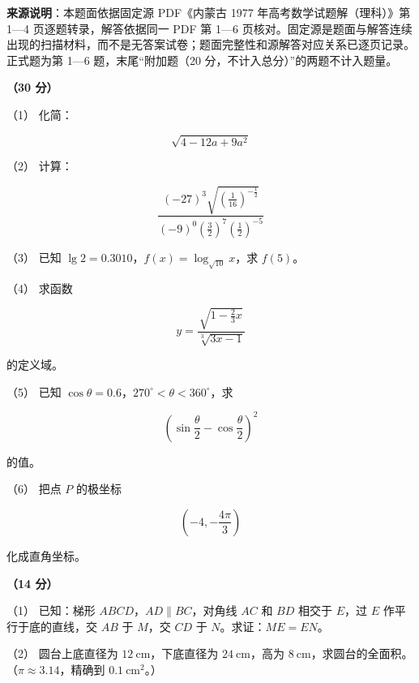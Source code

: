 


\begin{gktip}
\textbf{来源说明}：本题面依据固定源 PDF《内蒙古 1977 年高考数学试题解（理科）》第 1—4 页逐题转录，解答依据同一 PDF 第 1—6 页核对。固定源是题面与解答连续出现的扫描材料，而不是无答案试卷；题面完整性和源解答对应关系已逐页记录。正式题为第 1—6 题，末尾“附加题（20 分，不计入总分）”的两题不计入题量。
\end{gktip}

\begin{question}
\textbf{（30 分）} 

（1） 化简：

\nopagebreak[4]
\[
\sqrt{4-12a+9a^2}
\]

（2） 计算：

\nopagebreak[4]
\[
\frac{(-27)^3\sqrt{\left(\frac1{16}\right)^{-\frac12}}}
{(-9)^0\left(\frac32\right)^7\left(\frac12\right)^{-5}}
\]

（3） 已知 $\lg2=0.3010$，$f(x)=\log_{\sqrt{10}}x$，求 $f(5)$。

（4） 求函数

\nopagebreak[4]
\[
y=\frac{\sqrt{1-\frac23x}}{\sqrt[3]{3x-1}}
\]

的定义域。

（5） 已知 $\cos\theta=0.6$，$270^\circ<\theta<360^\circ$，求

\nopagebreak[4]
\[
\left(\sin\frac\theta2-\cos\frac\theta2\right)^2
\]

的值。

（6） 把点 $P$ 的极坐标

\nopagebreak[4]
\[
\left(-4,-\frac{4\pi}{3}\right)
\]

化成直角坐标。

\Needspace{0.4\textheight}
\end{question}
\begin{question}
\textbf{（14 分）} 

（1） 已知：梯形 $ABCD$，$AD\parallel BC$，对角线 $AC$ 和 $BD$ 相交于 $E$，过 $E$ 作平行于底的直线，交 $AB$ 于 $M$，交 $CD$ 于 $N$。求证：$ME=EN$。
\nopagebreak[4]
\begin{center}\end{center}
\nopagebreak[4]
（2） 圆台上底直径为 $12\ \mathrm{cm}$，下底直径为 $24\ \mathrm{cm}$，高为 $8\ \mathrm{cm}$，求圆台的全面积。（$\pi\approx3.14$，精确到 $0.1\ \mathrm{cm^2}$。）

\end{question}
